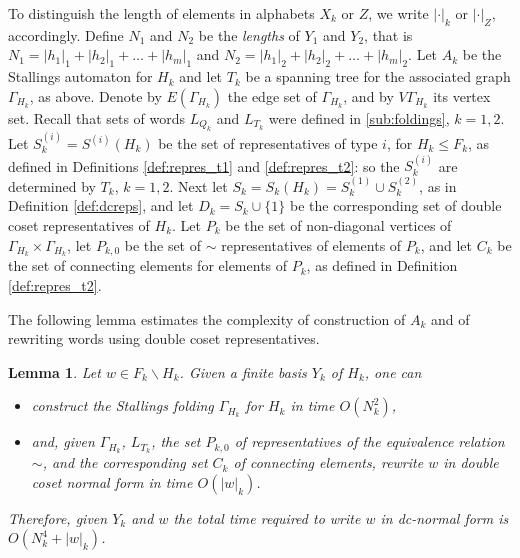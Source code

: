\documentclass[a4paper,12pt]{article}
\newcommand{\G}{\Gamma }
\newtheorem{lemma}[theorem]{Lemma}
\numberwithin{equation}{section}
\numberwithin{figure}{section}
\begin{document}
To distinguish the length of elements in alphabets $X_k$ or
$Z$, we write $|\cdot|_k$ or $|\cdot|_Z$, accordingly. Define  $N_1$ and $N_2$
be the \emph{lengths} of $Y_1$ and $Y_2$, that is
$N_1 = |h_1|_1 + |h_2|_1 + \ldots + |h_m|_1$ and $N_2 = |h_1|_2 +
|h_2|_2 + \ldots + |h_m|_2$. Let $A_k$ be the Stallings automaton
for $H_k$ and let $T_k$ be a spanning tree for the associated
graph $\G_{H_k}$, as above. Denote by $E(\G_{H_k})$ the  edge set
of $\G_{H_k}$, and by $V\G_{H_k}$  its vertex set.
Recall that sets of words  $L_{Q_k}$ and $L_{T_k}$
were defined in \ref{sub:foldings}, $k=1,2$. Let 
 $S_k^{(i)}=S^{(i)}(H_k)$ be the set
of representatives of type $i$,  for $H_k\le F_k$, as defined  in Definitions \ref{def:repres_t1}
and \ref{def:repres_t2}: so the  
$S_k^{(i)}$ are determined by  $T_k$, $k=1,2$. 
Next let 
$S_k=S_k(H_k)=S_k^{(1)}\cup S_k^{(2)}$, 
as in Definition  \ref{def:dcreps},   and let 
$D_k=S_k\cup\{1\}$ be the corresponding  
 set of
double coset representatives of $H_k$.  
Let $P_k$ be the set of non-diagonal
vertices of $\G_{H_k}\times \G_{H_k}$, let $P_{k,0}$ be the set of
$\sim$ representatives of elements of $P_k$, and let $C_k$ be
the set of connecting elements for elements of $P_k$, as defined in
Definition \ref{def:repres_t2}.


The following lemma estimates the complexity of
construction of $A_k$ and of rewriting words using
double coset representatives.
\begin{lemma}\label{lem:dctransversal} Let $w \in F_k \smallsetminus H_k$. Given a finite basis $Y_k$ of $H_k$, one can
\begin{itemize}
\item construct the Stallings folding $\G_{H_k}$ for $H_k$ in time $O(N_k^2)$,
\item and, given $\G_{H_k}$, $L_{T_k}$, the set $P_{k,0}$  of
 representatives of the equivalence relation $\sim$, and the
corresponding  set $C_k$ of connecting elements,
rewrite $w$ in  double coset normal
form in time  $O(|w|_k)$.
\end{itemize}
Therefore, given $Y_k$ and $w$ the total time required to write $w$ in dc-normal
 form is  $O(N_k^4 + |w|_k)$.
\end{lemma}
\end{document}
